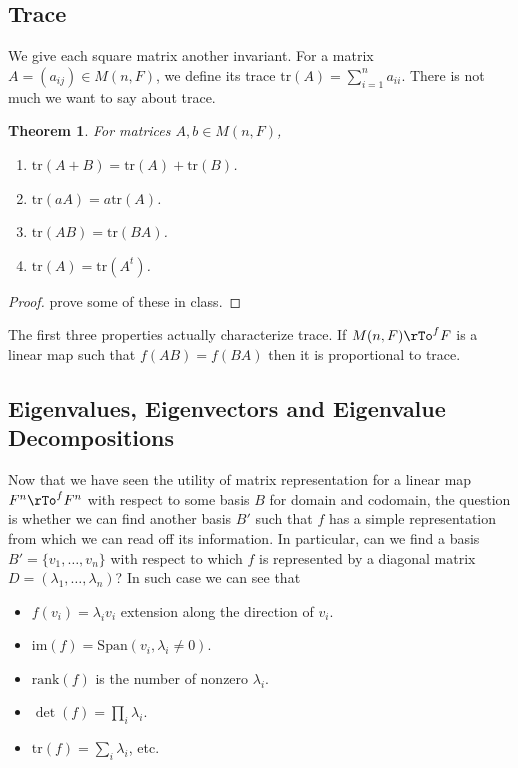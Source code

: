 \documentclass[12pt]{amsart}
\newtheorem{theorem}{Theorem}[section]
\theoremstyle{definition}
\begin{document}
\subsection{Trace} We give each square matrix another invariant.
\dfn For a matrix $A = (a_{ij}) \in M(n, F)$, we define its trace $\text{tr}(A) = \sum\limits_{i = 1}^n a_{ii}$.
There is not much we want to say about trace.

\begin{theorem}\label{} For matrices $A, b \in M(n, F)$,
\begin{enumerate}[\indent 1.]
\item $\text{tr}(A + B) = \text{tr}(A) + \text{tr}(B)$.
\item $\text{tr}(a A) = a \text{tr}(A)$.
\item $\text{tr}(AB) = \text{tr}(BA)$.
\item $\text{tr}(A) = \text{tr}(A^t)$.
\end{enumerate}
\end{theorem}
\begin{proof} prove some of these in class.
\end{proof}

The first three properties actually characterize trace. If $M(n, F) \rTo^f F$ is a linear map such that $f(AB) = f(BA)$ then it is proportional to trace.

\subsection{Eigenvalues, Eigenvectors and Eigenvalue Decompositions} Now that we have seen the utility of matrix representation for a linear map $F^n \rTo^f F^n$ with respect to some basis $B$ for domain and codomain, the question is whether we can find another basis $B'$ such that $f$ has a simple representation from which we can read off its information. In particular, can we find a basis $B' = \{v_1, \dots, v_n\}$ with respect to which $f$ is represented by a diagonal matrix $D = (\lambda_1, \dots, \lambda_n)$? In such case we can see that
\begin{itemize}
\item $f(v_i) = \lambda_i v_i$ extension along the direction of $v_i$.
\item $\text{im}(f) = \text{Span}(v_i, \lambda_i \neq 0)$.
\item $\text{rank}(f)$ is the number of nonzero $\lambda_i$.
\item $\det(f) = \prod\limits_i \lambda_i$.
\item $\text{tr}(f) = \sum\limits_i \lambda_i$, etc.
\end{itemize}
\end{document}
